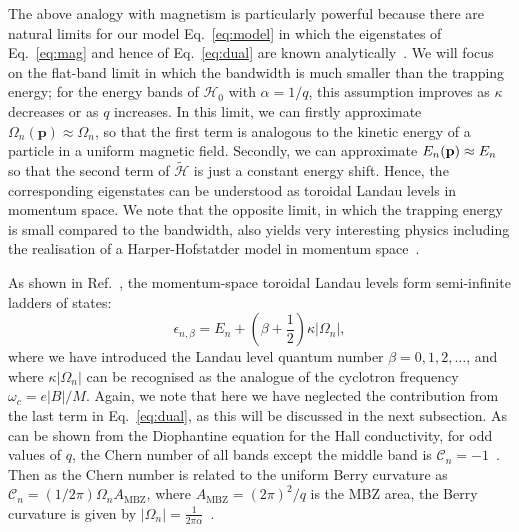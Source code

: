 The above analogy with magnetism is particularly powerful because
there are natural limits for our model Eq.~\eqref{eq:model} in which the
eigenstates of Eq.~\eqref{eq:mag} and hence of Eq.~\eqref{eq:dual} are
known analytically~\cite{price2014magnetic, ozawa2014momhh,
Claassen_prl_2015}. We will focus on the flat-band limit in which the
bandwidth is much smaller than the trapping energy; for the energy
bands of $\mathcal{H}_0$ with $\alpha = 1/q$, this assumption improves
as $\kappa$ decreases or as $q$ increases. In this limit, we can
firstly approximate $\Omega_{n}(\mathbf{p}) \approx \Omega_n$, so that
the first term is analogous to the kinetic energy of a particle in a
uniform magnetic field. Secondly, we can approximate $E_n(\mathbf{p})
\approx E_n$ so that the second term of $\widetilde{\mathcal{H}}$ is
just a constant energy shift. Hence, the corresponding eigenstates can
be understood as toroidal Landau levels in momentum space. We note
that the opposite limit, in which the trapping energy is small
compared to the bandwidth, also yields very interesting physics
including the realisation of a Harper-Hofstatder model in momentum
space~\cite{ozawa2014momhh, scaffidi2014exact}.

As shown in Ref.~\cite{price2014magnetic}, the momentum-space toroidal
Landau levels form semi-infinite ladders of states:
%
\begin{equation}\label{eq:ladders} \epsilon_{n,\beta} = E_n +
\left(\beta + \frac{1}{2}\right) \kappa |\Omega_n| ,
\end{equation} where we have introduced the Landau level quantum
number $\beta = 0,1,2,\dots$, and where $\kappa |\Omega_n|$ can be
recognised as the analogue of the cyclotron frequency $\omega_c = e
|B| /M $. Again, we note that here we have neglected the contribution
from the last term in Eq.~\eqref{eq:dual}, as this will be discussed in
the next subsection. As can be shown from the Diophantine equation for
the Hall conductivity, for odd values of $q$, the Chern number of all
bands except the middle band is $\mathcal{C}_n =
-1$~\cite{bernevig2013topological}. Then as the Chern number is
related to the uniform Berry curvature as $\mathcal{C}_n = (1/2\pi)
\Omega_n A_{\text{MBZ}}$, where $A_{\text{MBZ}} = (2\pi)^2/q$ is the
MBZ area, the Berry curvature is given by $|\Omega_n| =
\frac{1}{2\pi\alpha}$~\cite{price2014magnetic}.

